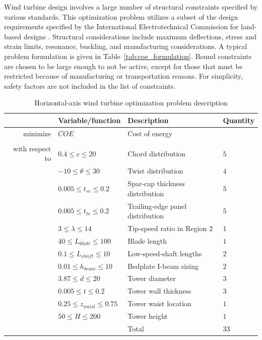 \documentclass[]{aiaa-tc} %
\begin{document}
    Wind turbine design involves a large number of structural constraints specified by various standards.  This optimization problem utilizes a subset of the design requirements specified by the International Electrotechnical Commission for land-based designs \cite{IEC}.  Structural considerations include maximum deflections, stress and strain limits, resonance, buckling, and manufacturing considerations.   A typical problem formulation is given in Table~\ref{tab:coe_formulation}.  Bound constraints are chosen to be large enough to not be active, except for those that must be restricted because of manufacturing or transportation reasons.  For simplicity, safety factors are not included in the list of constraints.

    \begin{table}[!htb]
        \centering
        \caption{Horizontal-axis wind turbine optimization problem description}
        \begin{tabular}{r l l l}
            \toprule
            & Variable/function & Description & Quantity \\
            \midrule
            minimize            & $COE$ & Cost of energy \\
            \\
            with respect to & $0.4 \le c \le 20$ & Chord distribution & $5$ \\
                                    & $-10 \le \theta \le 30$ & Twist distribution & $4$ \\
                                    & $0.005 \le t_{sc} \le 0.2$ & Spar-cap thickness distribution & $5$ \\
                                    & $0.005 \le t_{te} \le 0.2$ & Trailing-edge panel distribution & $5$ \\
                                    & $3 \le \lambda \le 14$ & Tip-speed ratio in Region 2 & $1$ \\
                                    & $40 \le L_{blade} \le 100$ & Blade length & $1$ \\
                                    & $0.1 \le L_{shaft} \le 10$ & Low-speed-shaft lengths & $2$ \\
                                    & $0.01 \le h_{beam} \le 10$ & Bedplate I-beam sizing & $2$ \\
                                    & $3.87 \le d \le 20$ & Tower diameter & $3$ \\
                                    & $0.005 \le t \le 0.2$ & Tower wall thickness & $3$ \\
                                    & $0.25 \le z_{waist} \le 0.75$ & Tower waist location & $1$ \\
                                    & $50 \le H \le 200$ & Tower height & $1$ \\
                                    & & Total & $33$ \\


\end{tabular}
\end{table}
\end{document}

